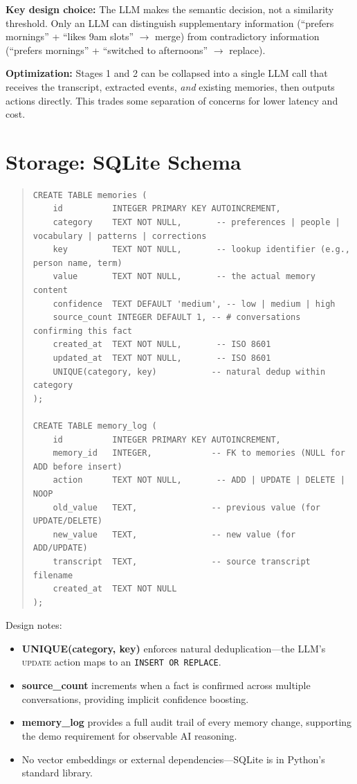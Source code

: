 \documentclass[11pt, letterpaper]{article}
\begin{document}
\noindent\textbf{Key design choice:} The LLM makes the semantic decision, not a
similarity threshold. Only an LLM can distinguish supplementary information
(``prefers mornings'' + ``likes 9am slots'' $\rightarrow$ merge) from contradictory
information (``prefers mornings'' + ``switched to afternoons'' $\rightarrow$ replace).

\textbf{Optimization:} Stages 1 and 2 can be collapsed into a single LLM call that
receives the transcript, extracted events, \emph{and} existing memories, then outputs
actions directly. This trades some separation of concerns for lower latency and cost.

\section{Storage: SQLite Schema}

\begin{quote}
\small
\begin{verbatim}
CREATE TABLE memories (
    id          INTEGER PRIMARY KEY AUTOINCREMENT,
    category    TEXT NOT NULL,       -- preferences | people | vocabulary | patterns | corrections
    key         TEXT NOT NULL,       -- lookup identifier (e.g., person name, term)
    value       TEXT NOT NULL,       -- the actual memory content
    confidence  TEXT DEFAULT 'medium', -- low | medium | high
    source_count INTEGER DEFAULT 1, -- # conversations confirming this fact
    created_at  TEXT NOT NULL,       -- ISO 8601
    updated_at  TEXT NOT NULL,       -- ISO 8601
    UNIQUE(category, key)           -- natural dedup within category
);

CREATE TABLE memory_log (
    id          INTEGER PRIMARY KEY AUTOINCREMENT,
    memory_id   INTEGER,            -- FK to memories (NULL for ADD before insert)
    action      TEXT NOT NULL,       -- ADD | UPDATE | DELETE | NOOP
    old_value   TEXT,               -- previous value (for UPDATE/DELETE)
    new_value   TEXT,               -- new value (for ADD/UPDATE)
    transcript  TEXT,               -- source transcript filename
    created_at  TEXT NOT NULL
);
\end{verbatim}
\end{quote}

\noindent Design notes:

\begin{itemize}[leftmargin=2em]
    \item \textbf{UNIQUE(category, key)} enforces natural deduplication---the LLM's
          \textsc{update} action maps to an \texttt{INSERT OR REPLACE}.
    \item \textbf{source\_count} increments when a fact is confirmed across multiple
          conversations, providing implicit confidence boosting.
    \item \textbf{memory\_log} provides a full audit trail of every memory change,
          supporting the demo requirement for observable AI reasoning.
    \item No vector embeddings or external dependencies---SQLite is in Python's standard library.
\end{itemize}
\end{document}
